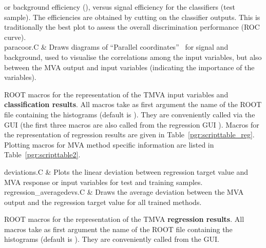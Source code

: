 \begin{table}[p]
\begin{programtable}
                          or background efficiency (), versus signal efficiency 
                          for the classifiers (test sample). The efficiencies are
                          obtained by cutting on the classifier outputs. This is traditionally 
                          the best plot to assess the overall discrimination performance (ROC curve).\\   
paracoor.C              & Draws diagrams of ``Parallel coordinates''~\cite{parallelcoor} 
                          for signal and background,
                          used to visualise the correlations among the input variables, 
                          but also between the MVA output and input variables (indicating
                          the importance of the variables).                           
\end{programtable}
\caption[.]{\programCaptionSize ROOT macros for the representation of the 
         TMVA input variables and {\bf classification results}. All macros take as first 
         argument the name of the ROOT file containing the histograms (default is 
         ). They are conveniently called via the  GUI
         (the first three macros are also called from the regression GUI ).      
         Macros for the representation of regression results are given in Table~\ref{pgr:scripttable_reg}.    
         Plotting macros for MVA method specific information are listed in 
         Table~\ref{pgr:scripttable2}. 
         }
\label{pgr:scripttable1}
\end{table}
\begin{table}[h!]
\begin{programtable}
deviations.C              & Plots the linear deviation between regression target value and MVA 
                            response or input variables for test and training samples. \\
regression\_averagedevs.C & Draws the average deviation between the MVA output and the 
                            regression target value for all trained methods. 
\end{programtable}
\caption[.]{\programCaptionSize ROOT macros for the representation of the 
         TMVA {\bf regression results}. All macros take as first argument the name of 
         the ROOT file containing the histograms (default is ). They 
         are conveniently called from the  GUI. 
         }
\label{pgr:scripttable_reg}
\end{table}
